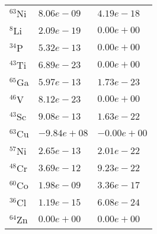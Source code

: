 \begin{tabular}{lll}
 $^{63}$Ni & $8.06e-09 $                                                        & $4.19e-18 $                                                                     \\
 $^{8}$Li  & $2.09e-19 $                                                        & $0.00e+00 $                                                                     \\
 $^{34}$P  & $5.32e-13 $                                                        & $0.00e+00 $                                                                     \\
 $^{43}$Ti & $6.89e-23 $                                                        & $0.00e+00 $                                                                     \\
 $^{65}$Ga & $5.97e-13 $                                                        & $1.73e-23 $                                                                     \\
 $^{46}$V  & $8.12e-23 $                                                        & $0.00e+00 $                                                                     \\
 $^{43}$Sc & $9.08e-13 $                                                        & $1.63e-22 $                                                                     \\
 $^{63}$Cu & $-9.84e+08 $                                                       & $-0.00e+00 $                                                                    \\
 $^{57}$Ni & $2.65e-13 $                                                        & $2.01e-22 $                                                                     \\
 $^{48}$Cr & $3.69e-12 $                                                        & $9.23e-22 $                                                                     \\
 $^{60}$Co & $1.98e-09 $                                                        & $3.36e-17 $                                                                     \\
 $^{36}$Cl & $1.19e-15 $                                                        & $6.08e-24 $                                                                     \\
 $^{64}$Zn & $0.00e+00 $                                                        & $0.00e+00 $                                                                     \\

\end{tabular}
